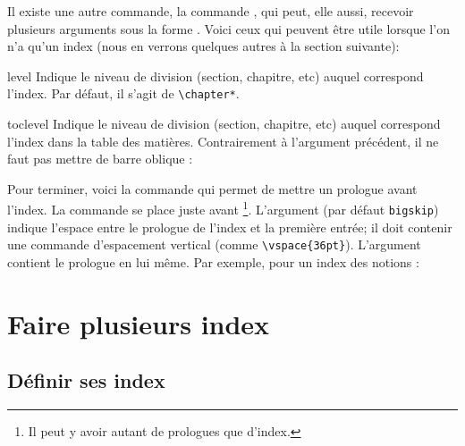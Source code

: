 Il existe une autre commande, la commande , qui peut, elle aussi, recevoir plusieurs arguments sous la forme
. Voici ceux qui peuvent être utile lorsque l'on n'a qu'un index (nous en verrons quelques autres à la section suivante):
\begin{choix}
\item[level] Indique le niveau de division (section, chapitre, etc) auquel correspond l'index. Par défaut, il s'agit de \verb|\chapter*|.
\item[toclevel] Indique le niveau de division (section, chapitre, etc) auquel correspond l'index dans la table des matières.  Contrairement à l'argument précédent, il ne faut pas mettre de barre oblique :

\begin{latexcode}
\indexsetup[level=\section*, toclevel=section]
\end{latexcode}
\end{choix}


Pour terminer, voici la commande  qui permet de mettre un prologue avant l'index. La commande se place juste avant \footnote{Il peut y avoir autant de prologues que d'index.}. L'argument  (par défaut \verb|bigskip|) indique l'espace   entre le prologue de l'index et la première entrée; il doit contenir  une commande d'espacement vertical (comme  \verb|\vspace{36pt}|). L'argument  contient le prologue en lui même. Par exemple, pour un index des notions :

\begin{latexcode}
\printindex
\end{latexcode}


\section{Faire plusieurs index}\label{multiindex}


\subsection{Définir ses index}

